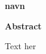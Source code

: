 \thispagestyle{plain}
\begin{center}
    \vspace{0.4cm}
    \textbf{navn}

    \vspace{0.9cm}
    \textbf{Abstract}
\end{center}
Text her 
